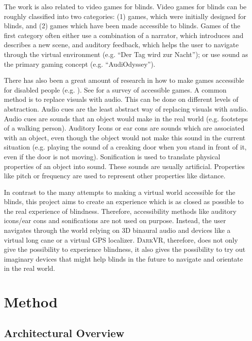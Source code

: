 \documentclass{sig-alternate}
\newcommand{\darkvr}{\textsc{DarkVR}\xspace}
\begin{document}
The work is also related to video games for blinds. Video games for blinds can
be roughly classified into two categories: (1) games, which were initially
designed for blinds, and (2) games which have been made accessible to blinds.
Games of the first category often either use a combination of a
narrator, which introduces and describes a new scene, and auditory feedback,
which helps the user to navigate through the virtual environment (e.g. ``Der Tag
wird zur Nacht''\cite{dertag}); or use sound as the primary gaming concept (e.g.
``AudiOdyssey''\cite{audiodyssey}).

There has also been a great amount of research in how to make games accessible
for disabled people (e.g. \cite{chile, terraformers, secondlife,
tankcommander}). See \cite{survey} for a survey of accessible games. A common
method is to replace visuals with audio. This can be done on different levels of
abstraction. Audio cues are the least abstract way of replacing visuals with
audio. Audio cues are sounds that an object would make in the real world (e.g.
footsteps of a walking person). Auditory Icons or ear cons are sounds which are
associated with an object, even though the object would not make this sound in
the current situation (e.g. playing the sound of a creaking door when you stand
in front of it, even if the door is not moving). Sonification is used to
translate physical properties of an object into sound. These sounds are usually
artificial. Properties like pitch or frequency are used to represent other
properties like distance.

In contrast to the many attempts to making a virtual world accessible for the
blinds, this project aims to create an experience which is as closed as
possible to the real experience of blindness. Therefore, accessibility methods
like auditory icons/ear cons and sonifications are not used on purpose. Instead,
the user navigates through the world relying on 3D binaural audio and devices
like a virtual long cane or a virtual GPS localizer. \darkvr, therefore,
does not only give the possibility to experience blindness, it also gives the
possibility to try out imaginary devices that might help blinds in the
future to navigate and orientate in the real world.

\section{Method}

\subsection{Architectural Overview}
\end{document}
